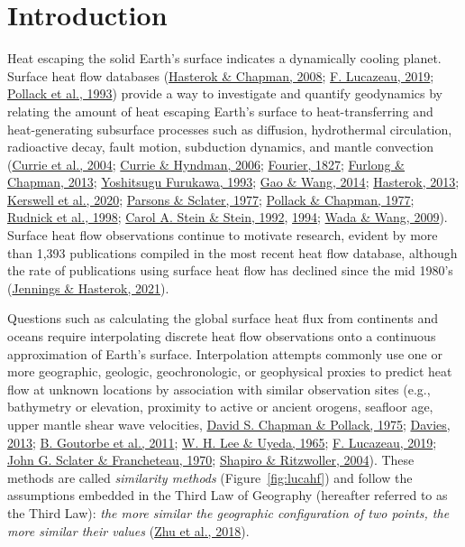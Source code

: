 \documentclass[draft,linenumbers]{agujournal2018}
\begin{document}
\section{Introduction}

Heat escaping the solid Earth's surface indicates a dynamically cooling
planet. Surface heat flow databases
(\protect\hyperlink{ref-hasterok2008}{Hasterok \& Chapman, 2008};
\protect\hyperlink{ref-lucazeau2019}{F. Lucazeau, 2019};
\protect\hyperlink{ref-pollack1993}{Pollack et al., 1993}) provide a way
to investigate and quantify geodynamics by relating the amount of heat
escaping Earth's surface to heat-transferring and heat-generating
subsurface processes such as diffusion, hydrothermal circulation,
radioactive decay, fault motion, subduction dynamics, and mantle
convection (\protect\hyperlink{ref-currie2004}{Currie et al., 2004};
\protect\hyperlink{ref-currie2006}{Currie \& Hyndman, 2006};
\protect\hyperlink{ref-fourier1827}{Fourier, 1827};
\protect\hyperlink{ref-furlong2013}{Furlong \& Chapman, 2013};
\protect\hyperlink{ref-furukawa1993}{Yoshitsugu Furukawa, 1993};
\protect\hyperlink{ref-gao2014}{Gao \& Wang, 2014};
\protect\hyperlink{ref-hasterok2013}{Hasterok, 2013};
\protect\hyperlink{ref-kerswell2020}{Kerswell et al., 2020};
\protect\hyperlink{ref-parsons1977}{Parsons \& Sclater, 1977};
\protect\hyperlink{ref-pollack1977}{Pollack \& Chapman, 1977};
\protect\hyperlink{ref-rudnick1998}{Rudnick et al., 1998};
\protect\hyperlink{ref-stein1992}{Carol A. Stein \& Stein, 1992},
\protect\hyperlink{ref-stein1994}{1994};
\protect\hyperlink{ref-wada2009}{Wada \& Wang, 2009}). Surface heat flow
observations continue to motivate research, evident by more than 1,393
publications compiled in the most recent heat flow database, although
the rate of publications using surface heat flow has declined since the
mid 1980's (\protect\hyperlink{ref-jennings2021}{Jennings \& Hasterok,
2021}).

Questions such as calculating the global surface heat flux from
continents and oceans require interpolating discrete heat flow
observations onto a continuous approximation of Earth's surface.
Interpolation attempts commonly use one or more geographic, geologic,
geochronologic, or geophysical proxies to predict heat flow at unknown
locations by association with similar observation sites (e.g.,
bathymetry or elevation, proximity to active or ancient orogens,
seafloor age, upper mantle shear wave velocities,
\protect\hyperlink{ref-chapman1975}{David S. Chapman \& Pollack, 1975};
\protect\hyperlink{ref-davies2013}{Davies, 2013};
\protect\hyperlink{ref-goutorbe2011}{B. Goutorbe et al., 2011};
\protect\hyperlink{ref-lee1965}{W. H. Lee \& Uyeda, 1965};
\protect\hyperlink{ref-lucazeau2019}{F. Lucazeau, 2019};
\protect\hyperlink{ref-sclater1970}{John G. Sclater \& Francheteau,
1970}; \protect\hyperlink{ref-shapiro2004}{Shapiro \& Ritzwoller,
2004}). These methods are called \emph{similarity methods}
(Figure~\ref{fig:lucahf}) and follow the assumptions embedded in the
Third Law of Geography (hereafter referred to as the Third Law):
\emph{the more similar the geographic configuration of two points, the
more similar their values} (\protect\hyperlink{ref-zhu2018}{Zhu et al.,
2018}).
\end{document}
